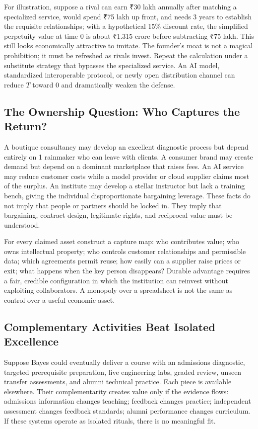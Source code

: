 For illustration, suppose a rival can earn ₹30 lakh annually after matching a specialized service, would spend ₹75 lakh up front, and needs 3 years to establish the requisite relationships; with a hypothetical 15\% discount rate, the simplified perpetuity value at time 0 is about ₹1.315 crore before subtracting ₹75 lakh. This still looks economically attractive to imitate. The founder's moat is not a magical prohibition; it must be refreshed as rivals invest. Repeat the calculation under a substitute strategy that bypasses the specialized service. An AI model, standardized interoperable protocol, or newly open distribution channel can reduce $T$ toward 0 and dramatically weaken the defense.

\subsection{The Ownership Question: Who Captures the Return?}
\label{sec:ownership_who_captures_return}

A boutique consultancy may develop an excellent diagnostic process but depend entirely on 1 rainmaker who can leave with clients. A consumer brand may create demand but depend on a dominant marketplace that raises fees. An AI service may reduce customer costs while a model provider or cloud supplier claims most of the surplus. An institute may develop a stellar instructor but lack a training bench, giving the individual disproportionate bargaining leverage. These facts do not imply that people or partners should be locked in. They imply that bargaining, contract design, legitimate rights, and reciprocal value must be understood.

For every claimed asset construct a capture map: who contributes value; who owns intellectual property; who controls customer relationships and permissible data; which agreements permit reuse; how easily can a supplier raise prices or exit; what happens when the key person disappears? Durable advantage requires a fair, credible configuration in which the institution can reinvest without exploiting collaborators. A monopoly over a spreadsheet is not the same as control over a useful economic asset.

\subsection{Complementary Activities Beat Isolated Excellence}
\label{sec:complementary_activities_beat_isolated_excellence}

Suppose Bayes could eventually deliver a course with an admissions diagnostic, targeted prerequisite preparation, live engineering labs, graded review, unseen transfer assessments, and alumni technical practice. Each piece is available elsewhere. Their complementarity creates value only if the evidence flows: admissions information changes teaching; feedback changes practice; independent assessment changes feedback standards; alumni performance changes curriculum. If these systems operate as isolated rituals, there is no meaningful fit.

